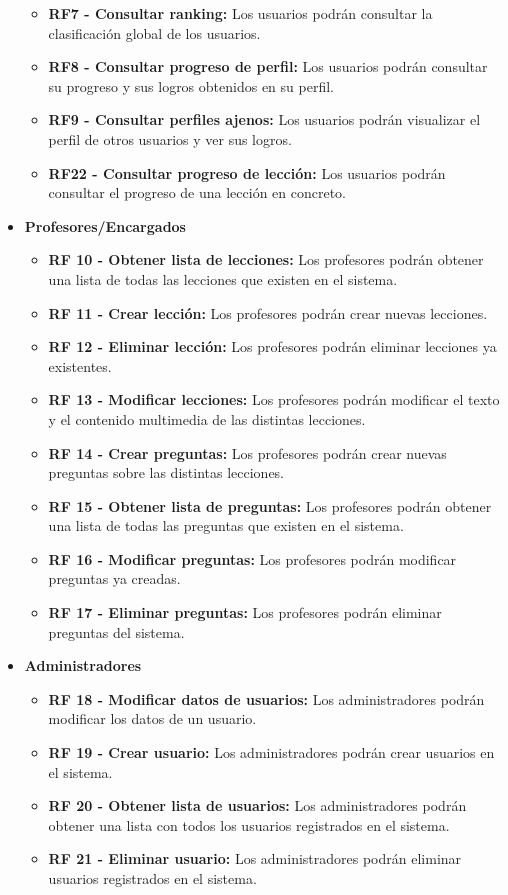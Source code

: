 \begin{itemize}
\begin{itemize}
              \item \textbf{RF7 - Consultar ranking: }Los usuarios podrán consultar la clasificación global de los usuarios.
              \item \textbf{RF8 - Consultar progreso de perfil: } Los usuarios podrán consultar su progreso y sus logros obtenidos en su perfil.
              \item \textbf{RF9 - Consultar perfiles ajenos: } Los usuarios podrán visualizar el perfil de otros usuarios y ver sus logros.
              \item \textbf{RF22 - Consultar progreso de lección: } Los usuarios podrán consultar el progreso de una lección en concreto.

            \end{itemize}
    \item \textbf{Profesores/Encargados}
          \begin{itemize}
              \item \textbf{RF 10 - Obtener lista de lecciones: } Los profesores podrán obtener una lista de todas las lecciones que existen en el sistema.
              \item \textbf{RF 11 - Crear lección: }Los profesores podrán crear nuevas lecciones.
              \item \textbf{RF 12 - Eliminar lección: }Los profesores podrán eliminar lecciones ya existentes.
              \item \textbf{RF 13 - Modificar lecciones: }Los profesores podrán modificar el texto y el contenido multimedia de las distintas lecciones.
              \item \textbf{RF 14 - Crear preguntas: } Los profesores podrán crear nuevas preguntas sobre las distintas lecciones.
              \item \textbf{RF 15 - Obtener lista de preguntas: } Los profesores podrán obtener una lista de todas las preguntas que existen en el sistema.
              \item \textbf{RF 16 - Modificar preguntas: } Los profesores podrán modificar preguntas ya creadas.
              \item \textbf{RF 17 - Eliminar preguntas: } Los profesores podrán eliminar preguntas del sistema.
          \end{itemize}
    \item \textbf{Administradores}
          \begin{itemize}
              \item \textbf{RF 18 - Modificar datos de usuarios: }Los administradores podrán modificar los datos de un usuario.
              \item \textbf{RF 19 - Crear usuario: }Los administradores podrán crear usuarios en el sistema.
              \item \textbf{RF 20 - Obtener lista de usuarios: } Los administradores podrán obtener una lista con todos los usuarios registrados en el sistema.
              \item \textbf{RF 21 - Eliminar usuario: }Los administradores podrán eliminar usuarios registrados en el sistema.
          \end{itemize}
\end{itemize}

